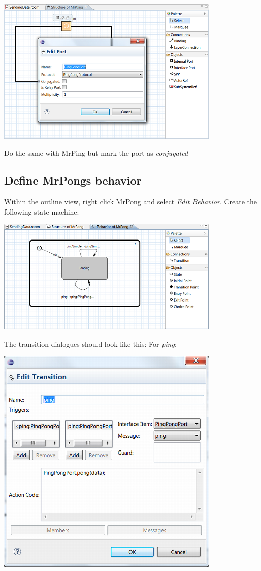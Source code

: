 \includegraphics[width=0.8\textwidth]{images/025-SendingData02.png}

Do the same with MrPing but mark the port as \textit{conjugated}

\subsection{Define MrPongs behavior}

Within the outline view, right click MrPong and select \textit{Edit Behavior}. Create the following state 
machine:

\includegraphics[width=0.8\textwidth]{images/025-SendingData04.png}

The transition dialogues should look like this:
For \textit{ping}:

\includegraphics[width=0.8\textwidth]{images/025-SendingData05.png}

